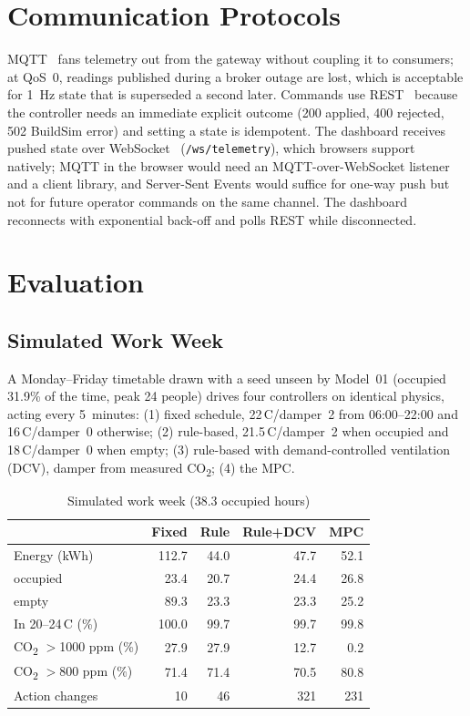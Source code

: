\documentclass[conference,10pt]{IEEEtran}
\newcommand{\cotwo}{CO\textsubscript{2}}
\newcommand{\degC}{\,\textdegree{}C}
\begin{document}
\section{Communication Protocols}
MQTT~\cite{mqtt5} fans telemetry out from the gateway without coupling it to consumers; at QoS~0, readings published during a broker outage are lost, which is acceptable for 1~Hz state that is superseded a second later. Commands use REST~\cite{fielding2000architectural} because the controller needs an immediate explicit outcome (200 applied, 400 rejected, 502 BuildSim error) and setting a state is idempotent. The dashboard receives pushed state over WebSocket~\cite{rfc6455} (\texttt{/ws/telemetry}), which browsers support natively; MQTT in the browser would need an MQTT-over-WebSocket listener and a client library, and Server-Sent Events would suffice for one-way push but not for future operator commands on the same channel. The dashboard reconnects with exponential back-off and polls REST while disconnected.

\section{Evaluation}
\subsection{Simulated Work Week}
A Monday--Friday timetable drawn with a seed unseen by Model~01 (occupied 31.9\% of the time, peak 24 people) drives four controllers on identical physics, acting every 5~minutes: (1) fixed schedule, 22\degC/damper~2 from 06:00--22:00 and 16\degC/damper~0 otherwise; (2) rule-based, 21.5\degC/damper~2 when occupied and 18\degC/damper~0 when empty; (3) rule-based with demand-controlled ventilation (DCV), damper from measured \cotwo{}; (4) the MPC.

\begin{table}[t]
\caption{Simulated work week (38.3 occupied hours)}
\label{tab:week}
\centering
\begin{tabular}{@{}lrrrr@{}}
\toprule
 & Fixed & Rule & Rule+DCV & MPC \\ \midrule
Energy (kWh) & 112.7 & 44.0 & 47.7 & 52.1 \\
\quad occupied & 23.4 & 20.7 & 24.4 & 26.8 \\
\quad empty & 89.3 & 23.3 & 23.3 & 25.2 \\
In 20--24\degC{} (\%) & 100.0 & 99.7 & 99.7 & 99.8 \\
\cotwo{} $>$1000 ppm (\%) & 27.9 & 27.9 & 12.7 & 0.2 \\
\cotwo{} $>$800 ppm (\%) & 71.4 & 71.4 & 70.5 & 80.8 \\
Action changes & 10 & 46 & 321 & 231 \\ \bottomrule
\end{tabular}
\end{table}
\end{document}
